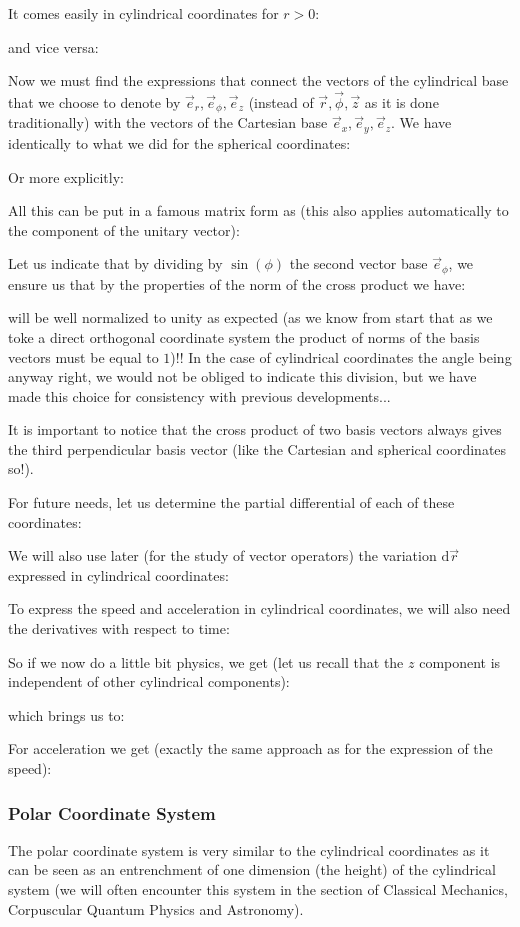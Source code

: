	It comes easily in cylindrical coordinates for $r>0$:
	
	and vice versa:
	 
	Now we must find the expressions that connect the vectors of the cylindrical base that we choose to denote by $\vec{e}_r,\vec{e}_\phi,\vec{e}_z$ (instead of $\vec{r}, \vec{\phi},\vec{z}$ as it is done traditionally) with the vectors of the Cartesian base $\vec{e}_x,\vec{e}_y,\vec{e}_z$. We have identically to what we did for the spherical coordinates:
	
	Or more explicitly:
	
	All this can be put in a famous matrix form as (this also applies automatically to the component of the unitary vector):
	
	Let us indicate that by dividing by $\sin(\phi)$ the second vector base $\vec{e}_\phi$, we ensure us that by the properties of the norm of the cross product we have:
	
	will be well normalized to unity as expected (as we know from start that as we toke a direct orthogonal coordinate system the product of norms of the basis vectors must be equal to $1$)!! In the case of cylindrical coordinates the angle being anyway right, we would not be obliged to indicate this division, but we have made this choice for consistency with previous developments...
	
	\begin{tcolorbox}[title=Remark,colframe=black,arc=10pt]
	It is important to notice that the cross product of two basis vectors always gives the third perpendicular  basis vector (like the Cartesian and spherical coordinates so!).
	\end{tcolorbox}
	For future needs, let us determine the partial differential of each of these coordinates:
	
	We will also use later (for the study of vector operators) the variation $\mathrm{d}\vec{r}$ expressed in cylindrical coordinates:
	
	To express the speed and acceleration in cylindrical coordinates, we will also need the derivatives with respect to time:
	
	So if we now do a little bit physics, we get (let us recall that the $z$ component is independent of other cylindrical components):
	
	which brings us to:
	
	For acceleration we get (exactly the same approach as for the expression of the speed):
	
	
	\subsubsection{Polar Coordinate System}\label{polar coordinates}
	The polar coordinate system is very similar to the cylindrical coordinates as it can be seen as an entrenchment of one dimension (the height) of the cylindrical system (we will often encounter this system in the section of Classical Mechanics, Corpuscular Quantum Physics and Astronomy).

